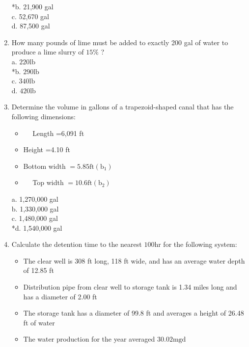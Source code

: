 \begin{enumerate}
*b. 21,900 gal\\
c. 52,670 gal\\
d. 87,500 gal\\
  \item How many pounds of lime must be added to exactly 200 gal of water to produce a lime slurry of $15 \%$ ?\\
a. $220 \mathrm{lb}$\\
*b. $290 \mathrm{lb}$\\
c. $340 \mathrm{lb}$\\
d. $420 \mathrm{lb}$ \\
\item Determine the volume in gallons of a trapezoid-shaped canal that has the following dimensions:\\
\begin{itemize}
  \item $\quad$ Length =6,091 ft\\
  \item Height =4.10 ft\\
  \item Bottom width $=5.85 \mathrm{ft}\left(\mathrm{b}_{1}\right)$\\
  \item $\quad$ Top width $=10.6 \mathrm{ft}\left(\mathrm{b}_{2}\right)$\\
  \end{itemize}
a. 1,270,000 gal\\
b. 1,330,000 gal\\
c. 1,480,000 gal\\
*d. 1,540,000 gal\\
  \item Calculate the detention time to the nearest $100 \mathrm{hr}$ for the following system:\\
\begin{itemize}
  \item The clear well is 308 ft long, 118 ft wide, and has an average water depth of 12.85 ft\\
  \item Distribution pipe from clear well to storage tank is 1.34 miles long and has a diameter of 2.00 ft\\
  \item The storage tank has a diameter of 99.8 ft and averages a height of 26.48 ft of water\\
  \item The water production for the year averaged $30.02 \mathrm{mgd}$\\

\end{itemize}
\end{enumerate}
